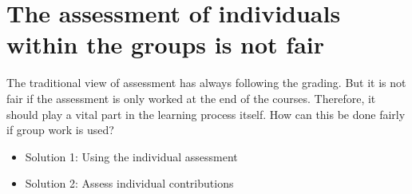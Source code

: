 \documentclass[letterpaper%
, twoside%
, 12pt%
,these%
, english%
,creativecommons,hyperref, withAlgo2e %
]{thETS}
\begin{document}
\section{The assessment of individuals within the groups is not fair}
The traditional view of assessment has always following the grading. But it is not fair if the assessment is only worked at the end of the courses. Therefore, it should play a vital part in the learning process itself. How can this be done fairly if group work is used?
\begin{itemize}
	\item Solution 1: Using the individual assessment
	\item Solution 2: Assess individual contributions
	
\end{itemize}
\end{document}
